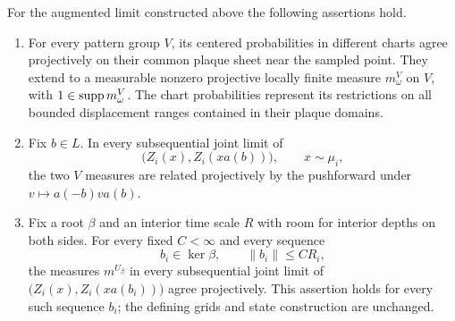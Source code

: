 \begin{proposition}\label{prop:plaque-comparison}
For the augmented limit constructed above the following assertions
hold.
\begin{enumerate}
\item For every pattern group $V$, its centered probabilities in
different charts agree projectively on their common plaque sheet
near the sampled point. They extend to a measurable nonzero
projective locally finite measure $m^V_\omega$ on $V$, with
$1\in\operatorname{supp} m^V_\omega$. The chart probabilities represent its
restrictions on all bounded displacement ranges contained in their
plaque domains.
\item Fix $b\in L$. In every subsequential joint limit of
\[
 \bigl(Z_i(x),Z_i(xa(b))\bigr),\qquad x\sim\mu_i,
\]
the two $V$ measures are related projectively by the pushforward
under $v\mapsto a(-b)va(b)$.
\item Fix a root $\beta$ and an interior time scale $R$ with room
for interior depths on both sides. For every fixed $C<\infty$ and
every sequence
\[
 b_i\in\ker\beta,\qquad \|b_i\|\le CR_i,
\]
the measures $m^{U_\beta}$ in every subsequential joint limit of
$\bigl(Z_i(x),Z_i(xa(b_i))\bigr)$ agree projectively. This assertion
holds for every such sequence $b_i$; the defining grids and state
construction are unchanged.
\end{enumerate}
\end{proposition}

